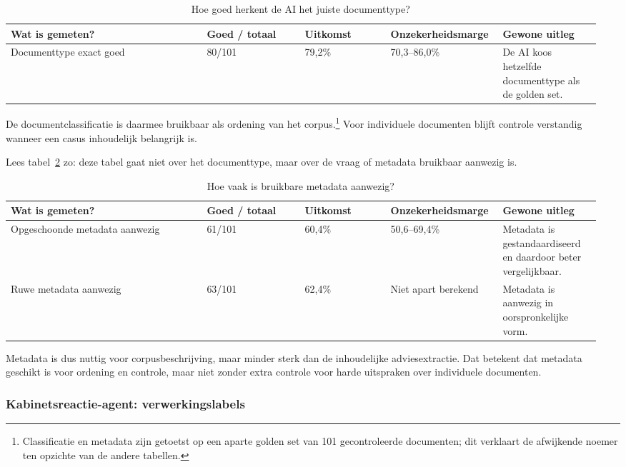 \begin{table}[htbp]
\centering
\small
\caption{Hoe goed herkent de AI het juiste documenttype?}
\label{tab:dv2-golden-set-classificatie}
\begin{tabular}{p{0.32\linewidth}p{0.16\linewidth}p{0.14\linewidth}p{0.18\linewidth}p{0.16\linewidth}}
\hline
Wat is gemeten? & Goed / totaal & Uitkomst & Onzekerheidsmarge & Gewone uitleg \\
\hline
Documenttype exact goed & 80/101 & 79,2\% & 70,3--86,0\% & De AI koos hetzelfde documenttype als de golden set. \\
\hline
\end{tabular}
\end{table}

De documentclassificatie is daarmee bruikbaar als ordening van het corpus.\footnote{Classificatie en metadata zijn getoetst op een aparte golden set van 101 gecontroleerde documenten; dit verklaart de afwijkende noemer ten opzichte van de andere tabellen.} Voor individuele documenten blijft controle verstandig wanneer een casus inhoudelijk belangrijk is.

Lees tabel~\ref{tab:dv2-golden-set-metadata} zo: deze tabel gaat niet over het documenttype, maar over de vraag of metadata bruikbaar aanwezig is.

\begin{table}[htbp]
\centering
\small
\caption{Hoe vaak is bruikbare metadata aanwezig?}
\label{tab:dv2-golden-set-metadata}
\begin{tabular}{p{0.32\linewidth}p{0.16\linewidth}p{0.14\linewidth}p{0.18\linewidth}p{0.16\linewidth}}
\hline
Wat is gemeten? & Goed / totaal & Uitkomst & Onzekerheidsmarge & Gewone uitleg \\
\hline
Opgeschoonde metadata aanwezig & 61/101 & 60,4\% & 50,6--69,4\% & Metadata is gestandaardiseerd en daardoor beter vergelijkbaar. \\
Ruwe metadata aanwezig & 63/101 & 62,4\% & Niet apart berekend & Metadata is aanwezig in oorspronkelijke vorm. \\
\hline
\end{tabular}
\end{table}

Metadata is dus nuttig voor corpusbeschrijving, maar minder sterk dan de inhoudelijke adviesextractie. Dat betekent dat metadata geschikt is voor ordening en controle, maar niet zonder extra controle voor harde uitspraken over individuele documenten.

\subsubsection{Kabinetsreactie-agent: verwerkingslabels}
\label{subsubsec:dv2-golden-kabinetsreactie}

